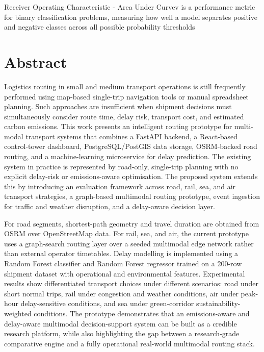 Receiver Operating Characteristic - Area Under Curvev  is a performance metric for binary classification problems, measuring 
how well a model separates positive and negative classes across all possible probability thresholds

\section{Abstract}
Logistics routing in small and medium transport operations is still frequently performed using map-based single-trip navigation tools or manual spreadsheet planning. Such approaches are insufficient when shipment decisions must simultaneously consider route time, delay risk, transport cost, and estimated carbon emissions. This work presents an intelligent routing prototype for multi-modal transport systems that combines a FastAPI backend, a React-based control-tower dashboard, PostgreSQL/PostGIS data storage, OSRM-backed road routing, and a machine-learning microservice for delay prediction. The existing system in practice is represented by road-only, single-trip planning with no explicit delay-risk or emissions-aware optimisation. The proposed system extends this by introducing an evaluation framework across road, rail, sea, and air transport strategies, a graph-based multimodal routing prototype, event ingestion for traffic and weather disruption, and a delay-aware decision layer. 

For road segments, shortest-path geometry and travel duration are obtained from OSRM over OpenStreetMap data. For rail, sea, and air, the current prototype uses a graph-search routing layer over a seeded multimodal edge network rather than external operator timetables. Delay modelling is implemented using a Random Forest classifier and Random Forest regressor trained on a 200-row shipment dataset with operational and environmental features. Experimental results show differentiated transport choices under different scenarios: road under short normal trips, rail under congestion and weather conditions, air under peak-hour delay-sensitive conditions, and sea under green-corridor sustainability-weighted conditions. The prototype demonstrates that an emissions-aware and delay-aware multimodal decision-support system can be built as a credible research platform, while also highlighting the gap between a research-grade comparative engine and a fully operational real-world multimodal routing stack.


